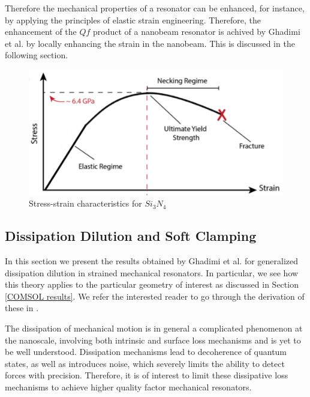 \documentclass[%
 reprint,
nofootinbib,
 amsmath,amssymb,
 aps,
]{revtex4-2}
\begin{document}
Therefore the mechanical properties of a resonator can be enhanced, for instance, by applying the principles of elastic strain engineering. Therefore, the enhancement of the $Qf$ product of a nanobeam resonator is achived by Ghadimi et al. \cite{ghadimi_main_paper} by locally enhancing the strain in the nanobeam. This is discussed in the following section. 

\begin{figure}[H]
    \centering
    \includegraphics[width = \columnwidth]{stress_strain_Si3N4.PNG}
    \caption{Stress-strain characteristics for $Si_{3} N_{4}$ \cite{mechanical_resonators_optomechanics_room_temp}}
    \label{fig:stress_strain_Si3N4}
\end{figure}


\subsection{Dissipation Dilution and Soft Clamping}\label{Dissipation Dilution and Soft Clamping}
In this section we present the results obtained by Ghadimi et al. \cite{generalized_dissipation_dilution} for generalized dissipation dilution in strained mechanical resonators. In particular, we see how this theory applies to the particular geometry of interest as discussed in Section \ref{COMSOL results}. We refer the interested reader to go through the derivation of these in \cite{generalized_dissipation_dilution, ghadimi_main_paper}. 
\newline

The dissipation of mechanical motion is in general a complicated phenomenon at the nanoscale, involving both intrinsic and surface loss mechanisms and is yet to be well understood. Dissipation mechanisms lead to decoherence of quantum states, as well as introduces noise, which severely limits the ability to detect forces with precision. Therefore, it is of interest to limit these dissipative loss mechanisms to achieve higher quality factor mechanical resonators.
\newline
\end{document}
